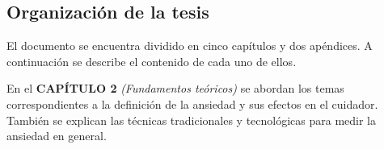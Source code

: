 

\subsection{Organizaci\'on de la tesis}
	El documento se encuentra dividido en cinco cap\'itulos y dos ap\'endices. A continuaci\'on se describe el contenido de cada uno de ellos.
	
	En el \textbf{CAP\'ITULO 2} \textit{(Fundamentos te\'oricos)} se abordan los temas correspondientes a la definici\'on de la ansiedad y sus efectos en el cuidador. Tambi\'en se explican las t\'ecnicas tradicionales y tecnol\'ogicas para medir la ansiedad en general.

